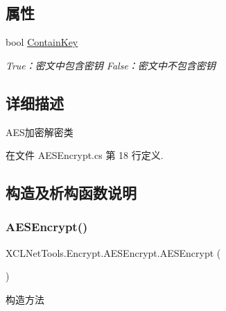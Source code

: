 \subsection*{属性}
\begin{DoxyCompactItemize}
\item 
bool \hyperlink{class_x_c_l_net_tools_1_1_encrypt_1_1_a_e_s_encrypt_aff7c2c090ff50543aa60c0c5895b8a1e}{Contain\+Key}
\begin{DoxyCompactList}\small\item\em True：密文中包含密钥 False：密文中不包含密钥 \end{DoxyCompactList}\end{DoxyCompactItemize}


\subsection{详细描述}
A\+E\+S加密解密类 



在文件 A\+E\+S\+Encrypt.\+cs 第 18 行定义.



\subsection{构造及析构函数说明}
\mbox{\label{class_x_c_l_net_tools_1_1_encrypt_1_1_a_e_s_encrypt_a5fb828cbf3cf36b59138650043c2a559}} 
\subsubsection{\texorpdfstring{A\+E\+S\+Encrypt()}{AESEncrypt()}\hspace{0.1cm}{\footnotesize\ttfamily [1/2]}}
{\footnotesize\ttfamily X\+C\+L\+Net\+Tools.\+Encrypt.\+A\+E\+S\+Encrypt.\+A\+E\+S\+Encrypt (\begin{DoxyParamCaption}{ }\end{DoxyParamCaption})}



构造方法 



